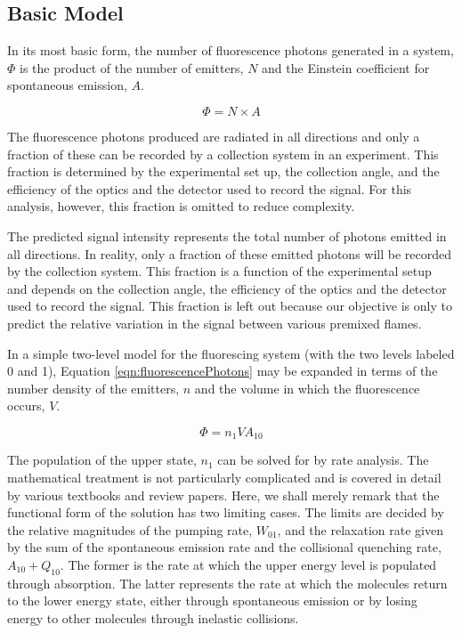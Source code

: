 \subsection{Basic Model}
\label{subsec:chplif-basic-model}

In its most basic form, the number of fluorescence photons generated in a system, \(\Phi\) is the product of the number of emitters, \(N\) and the Einstein coefficient for spontaneous emission, \(A\).

\begin{equation}
  \Phi = N\times A
  \label{eqn:fluorescencePhotons}
\end{equation}

The fluorescence photons produced are radiated in all directions and only a fraction of these can be recorded by a collection system in an experiment.
This fraction is determined by the experimental set up, the collection angle, and the efficiency of the optics and the detector used to record the signal.
For this analysis, however, this fraction is omitted to reduce complexity.

The predicted signal intensity represents the total number of photons emitted in all directions.
In reality, only a fraction of these emitted photons will be recorded by the collection system.
This fraction is a function of the experimental setup and depends on the collection angle, the efficiency of the optics and the detector used to record the signal.
This fraction is left out because our objective is only to predict the relative variation in the signal between various premixed flames.

In a simple two-level model for the fluorescing system (with the two levels labeled 0 and 1), Equation \ref{eqn:fluorescencePhotons} may be expanded in terms of the number density of the emitters, \(n\) and the volume in which the fluorescence occurs, \(V\).

\begin{equation}
  \Phi = n_1VA_{10}
\end{equation}

The population of the upper state, \(n_1\) can be solved for by rate analysis.
The mathematical treatment is not particularly complicated and is covered in detail by various textbooks and review papers.\cite{1997-daily}
Here, we shall merely remark that the functional form of the solution has two limiting cases.
The limits are decided by the relative magnitudes of the pumping rate, \(W_{01}\), and the relaxation rate given by the sum of the spontaneous emission rate and the collisional quenching rate, \(A_{10} + Q_{10}\).
The former is the rate at which the upper energy level is populated through absorption.
The latter represents the rate at which the molecules return to the lower energy state, either through spontaneous emission or by losing energy to other molecules through inelastic collisions.

